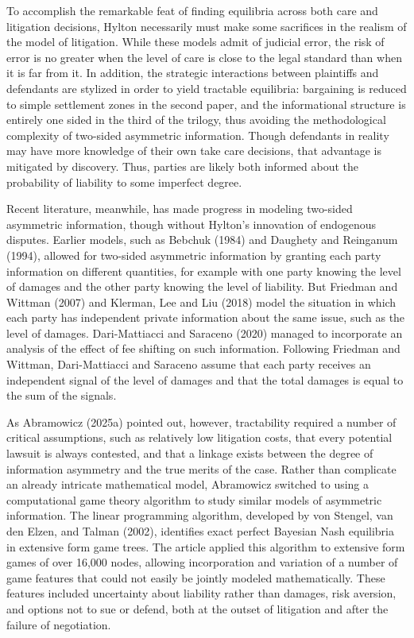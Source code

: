 \documentclass{article}
\begin{document}
To accomplish the remarkable feat of finding equilibria across both care and litigation decisions, Hylton necessarily must make some sacrifices in the realism of the model of litigation. While these models admit of judicial error, the risk of error is no greater when the level of care is close to the legal standard than when it is far from it. In addition, the strategic interactions between plaintiffs and defendants are stylized in order to yield tractable equilibria: bargaining is reduced to simple settlement zones in the second paper, and the informational structure is entirely one sided in the third of the trilogy, thus avoiding the methodological complexity of two-sided asymmetric information. Though defendants in reality may have more knowledge of their own take care decisions, that advantage is mitigated by discovery. Thus, parties are likely both informed about the probability of liability to some imperfect degree.

Recent literature, meanwhile, has made progress in modeling two-sided asymmetric information, though without Hylton's innovation of endogenous disputes. Earlier models, such as Bebchuk (1984) and Daughety and Reinganum (1994), allowed for two-sided asymmetric information by granting each party information on different quantities, for example with one party knowing the level of damages and the other party knowing the level of liability. But Friedman and Wittman (2007) and Klerman, Lee and Liu (2018) model the situation in which each party has independent private information about the same issue, such as the level of damages. Dari-Mattiacci and Saraceno (2020) managed to incorporate an analysis of the effect of fee shifting on such information. Following Friedman and Wittman, Dari-Mattiacci and Saraceno assume that each party receives an independent signal of the level of damages and that the total damages is equal to the sum of the signals.

As Abramowicz (2025a) pointed out, however, tractability required a number of critical assumptions, such as relatively low litigation costs, that every potential lawsuit is always contested, and that a linkage exists between the degree of information asymmetry and the true merits of the case. Rather than complicate an already intricate mathematical model, Abramowicz switched to using a computational game theory algorithm to study similar models of asymmetric information. The linear programming algorithm, developed by von Stengel, van den Elzen, and Talman (2002), identifies exact perfect Bayesian Nash equilibria in extensive form game trees. The article applied this algorithm to extensive form games of over 16,000 nodes, allowing incorporation and variation of a number of game features that could not easily be jointly modeled mathematically. These features included uncertainty about liability rather than damages, risk aversion, and options not to sue or defend, both at the outset of litigation and after the failure of negotiation.
\end{document}
